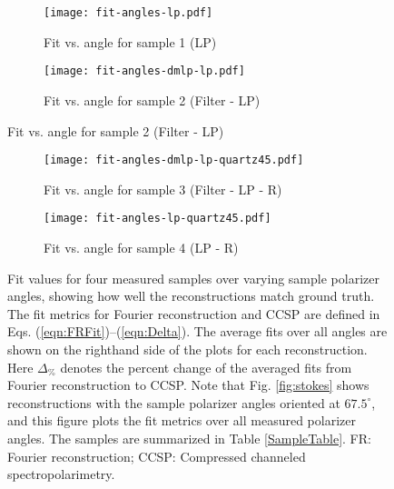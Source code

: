 \documentclass[10pt]{article}
\numberwithin{equation}{subsection}
\begin{document}
    \begin{figure}[!htb]
  \begin{subfigure}[b]{0.5\linewidth}
    \centering
    \texttt{[image: fit-angles-lp.pdf]}
      \caption{Fit vs. angle for sample 1 (LP)}
    \label{fig:fitangles1}
    \vspace{4ex}
  \end{subfigure}%
  \begin{subfigure}[b]{0.5\linewidth}
    \centering
    \texttt{[image: fit-angles-dmlp-lp.pdf]}
    \caption{Fit vs. angle for sample 2 (Filter - LP)}
    \label{fig:fitangles2}
    \vspace{4ex}
  \end{subfigure}
\end{figure}
\begin{figure}[!htb]\ContinuedFloat
  \begin{subfigure}[b]{0.5\linewidth}
    \centering
    \texttt{[image: fit-angles-dmlp-lp-quartz45.pdf]}
    \caption{Fit vs. angle for sample 3 (Filter - LP - R)}
    \label{fig:fitangles3}
  \end{subfigure}%
  \begin{subfigure}[b]{0.5\linewidth}
    \centering
    \texttt{[image: fit-angles-lp-quartz45.pdf]}
    \caption{Fit vs. angle for sample 4 (LP - R)}
    \label{fig:figangles4}
  \end{subfigure}
  \caption{Fit values for four measured samples over varying sample polarizer angles, showing how well the reconstructions match ground truth.
        The fit metrics for Fourier reconstruction and CCSP are defined in Eqs. (\ref{eqn:FRFit})--(\ref{eqn:Delta}).
        The average fits over all angles are shown on the righthand side of the plots for each reconstruction.
        Here $\Delta_\%$ denotes the percent change of the averaged fits from Fourier reconstruction to CCSP.
      Note that Fig. \ref{fig:stokes} shows reconstructions with the sample polarizer angles oriented at $67.5^\circ$, and this figure plots the fit metrics over all measured polarizer angles.
      The samples are summarized in Table \ref{SampleTable}.
    FR: Fourier reconstruction; CCSP: Compressed channeled spectropolarimetry.}
  \label{fig:fitangles}
\end{figure}

\end{document}
